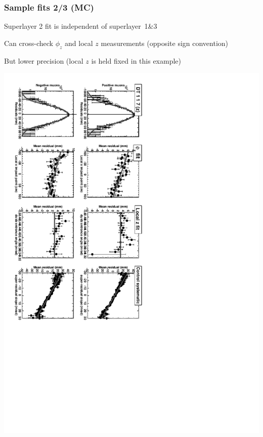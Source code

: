\documentclass[compress]{beamer}
\begin{document}
\begin{frame}
\frametitle{Sample fits 2/3 (MC)}

Superlayer 2 fit is independent of superlayer~1\&3

\vfill
Can cross-check $\phi_z$ and local $z$ measurements (opposite sign convention)

\vfill
But lower precision (local $z$ is held fixed in this example)

\vfill
\includegraphics[height=\linewidth, angle=90]{exampleDT_z.pdf}
\end{frame}
\end{document}

